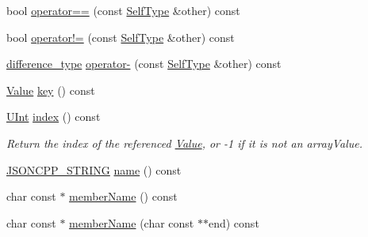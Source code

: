 \begin{DoxyCompactItemize}
bool \hyperlink{class_json_1_1_value_iterator_base_a1248d8016f88b51371a0fcbd355b3cfd}{operator==} (const \hyperlink{class_json_1_1_value_iterator_base_a9d2a940d03ea06d20d972f41a89149ee}{Self\+Type} \&other) const
\item 
bool \hyperlink{class_json_1_1_value_iterator_base_aa83bdcc8114b7d040eb8eb42eeed5f4a}{operator!=} (const \hyperlink{class_json_1_1_value_iterator_base_a9d2a940d03ea06d20d972f41a89149ee}{Self\+Type} \&other) const
\item 
\hyperlink{class_json_1_1_value_iterator_base_a4e44bf8cbd17ec8d6e2c185904a15ebd}{difference\+\_\+type} \hyperlink{class_json_1_1_value_iterator_base_a98e254263fca5f1fc8fcac7bcb0260bf}{operator-\/} (const \hyperlink{class_json_1_1_value_iterator_base_a9d2a940d03ea06d20d972f41a89149ee}{Self\+Type} \&other) const
\item 
\hyperlink{class_json_1_1_value}{Value} \hyperlink{class_json_1_1_value_iterator_base_a3838ba39c43c518cf3ed4aa6ce78ccad}{key} () const
\item 
\hyperlink{namespace_json_a800fb90eb6ee8d5d62b600c06f87f7d4}{U\+Int} \hyperlink{class_json_1_1_value_iterator_base_a549c66a0bd20e9ae772175a5c0d2e88a}{index} () const
\begin{DoxyCompactList}\small\item\em Return the index of the referenced \hyperlink{class_json_1_1_value}{Value}, or -\/1 if it is not an array\+Value. \end{DoxyCompactList}\item 
\hyperlink{json_8h_a1e723f95759de062585bc4a8fd3fa4be}{J\+S\+O\+N\+C\+P\+P\+\_\+\+S\+T\+R\+I\+NG} \hyperlink{class_json_1_1_value_iterator_base_a522989403c976fdbb94da846b99418db}{name} () const
\item 
char const  $\ast$ \hyperlink{class_json_1_1_value_iterator_base_a54765da6759fd3f1edcbfbaf308ec263}{member\+Name} () const
\item 
char const  $\ast$ \hyperlink{class_json_1_1_value_iterator_base_a391c9cbd0edf9a447b37df00e8ce6059}{member\+Name} (char const $\ast$$\ast$end) const
\end{DoxyCompactItemize}
